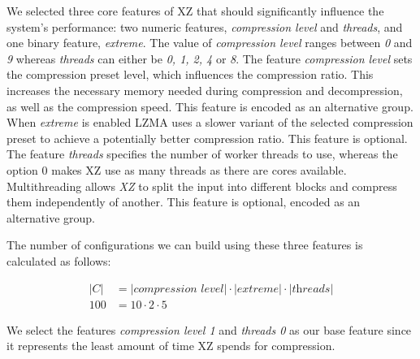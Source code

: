 We selected three core features of \textsc{XZ} that should significantly influence the system's performance: 
two numeric features, \emph{compression level} and \emph{threads}, and one binary feature, \emph{extreme}. 
The value of \emph{compression level} ranges between \emph{0} and \emph{9} whereas \emph{threads} can either be \emph{0, 1, 2, 4} or \emph{8}. 
The feature \emph{compression level} sets the compression preset level, which influences the compression ratio.
This increases the necessary memory needed during compression and decompression, as well as the compression speed. 
This feature is encoded as an alternative group.
When \emph{extreme} is enabled \textsc{LZMA} uses a slower variant of the selected compression preset to achieve a potentially better compression ratio.
This feature is optional.
The feature \emph{threads} specifies the number of worker threads to use, whereas the option $0$ makes \textsc{XZ}  use as many threads as there are cores available.
Multithreading allows \emph{XZ} to split the input into different blocks and compress them independently of another.
This feature is optional, encoded as an alternative group.


The number of configurations we can build using these three features is calculated as follows:

\begin{align}
    \lvert C \rvert &= \lvert \textit{compression level} \rvert \cdot \lvert \textit{extreme} \rvert \cdot \lvert \textit{threads} \rvert \\
    100 &= 10 \cdot 2 \cdot 5 \nonumber
\end{align}

We select the features \emph{compression level 1} and \emph{threads 0} as our base feature since it represents the least amount of time 
\textsc{XZ} spends for compression.